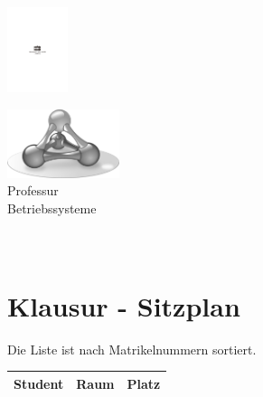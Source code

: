 \documentclass[12pt]{article}
\newcommand{\titleblock}{
  \begin{minipage}[c]{4cm}
  \includegraphics[height=2.5cm,width=\textwidth,keepaspectratio]{../lib/TUC}
  \end{minipage}%
  \hfill%
  \begin{minipage}[c]{4cm}
  \includegraphics[height=2cm,width=\textwidth,keepaspectratio]{../lib/logo-sw} \\
  {\scriptsize{Professur\\[-2.5mm] Betriebssysteme}\vspace{1mm}}
  \end{minipage}
\section*{\coursename \xspace \coursesemester \\ Klausur - Sitzplan}

Die Liste ist nach Matrikelnummern sortiert.
}
\begin{document}
\begin{centering}
\titleblock\begin{multicols}{3}\vspace{1em}
\begin{tabularx}{\textwidth}{rrr}
\toprule
 Student & Raum & Platz \\
\midrule

\bottomrule
\end{tabularx}
\end{multicols}
\end{centering}
\end{document}
